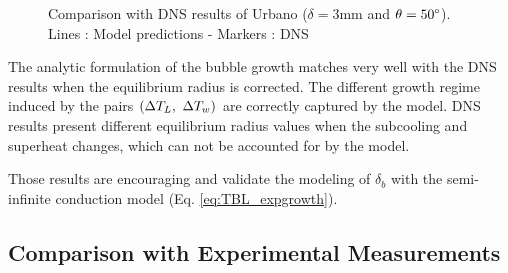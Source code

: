 \begin{figure}[h!]
\caption{Comparison with DNS results of Urbano \etal \cite{urbano_direct_2019} ($\delta=3$mm and $\theta=50\degree$). Lines : Model predictions - Markers : DNS }
\label{fig:growth_comp_urbano}
\end{figure}

The analytic formulation of the bubble growth matches very well with the DNS results when the equilibrium radius is corrected. The different growth regime induced by the pairs $\left( \Delta T_{L},\ \Delta T_{w} \right)$ are correctly captured by the model. DNS results present different equilibrium radius values when the subcooling and superheat changes, which can not be accounted for by the model.

\npar

\begin{remark*}{}
Those results are encouraging and validate the modeling of $\delta_{b}$ with the semi-infinite conduction model (Eq. \ref{eq:TBL_expgrowth}).
\end{remark*}



\subsection{Comparison with Experimental Measurements}

